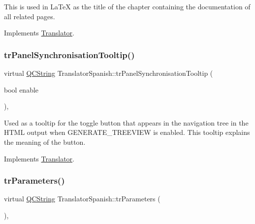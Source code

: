 This is used in La\+TeX as the title of the chapter containing the documentation of all related pages. 

Implements \mbox{\hyperlink{class_translator}{Translator}}.

\mbox{\label{class_translator_spanish_a54230d1cfc8e03e119613008538def43}} 
\subsubsection{\texorpdfstring{trPanelSynchronisationTooltip()}{trPanelSynchronisationTooltip()}}
{\footnotesize\ttfamily virtual \mbox{\hyperlink{class_q_c_string}{Q\+C\+String}} Translator\+Spanish\+::tr\+Panel\+Synchronisation\+Tooltip (\begin{DoxyParamCaption}\item[{bool}]{enable }\end{DoxyParamCaption})\hspace{0.3cm}{\ttfamily [inline]}, {\ttfamily [virtual]}}

Used as a tooltip for the toggle button that appears in the navigation tree in the H\+T\+ML output when G\+E\+N\+E\+R\+A\+T\+E\+\_\+\+T\+R\+E\+E\+V\+I\+EW is enabled. This tooltip explains the meaning of the button. 

Implements \mbox{\hyperlink{class_translator}{Translator}}.

\mbox{\label{class_translator_spanish_acd0478b340159741a71efa4c1cd31c84}} 
\subsubsection{\texorpdfstring{trParameters()}{trParameters()}}
{\footnotesize\ttfamily virtual \mbox{\hyperlink{class_q_c_string}{Q\+C\+String}} Translator\+Spanish\+::tr\+Parameters (\begin{DoxyParamCaption}{ }\end{DoxyParamCaption})\hspace{0.3cm}{\ttfamily [inline]}, {\ttfamily [virtual]}}

